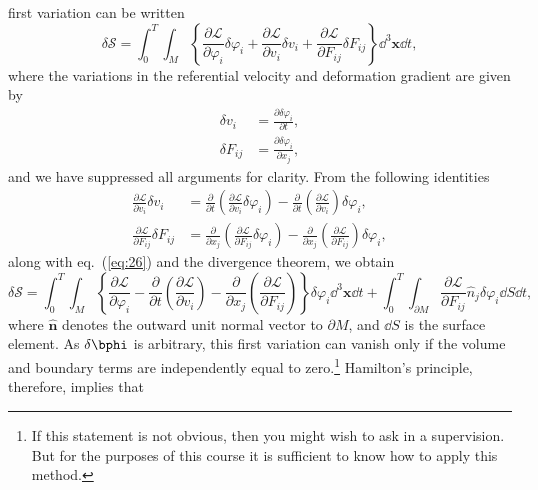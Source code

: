 first variation can be written
\begin{equation}
\delta\mathcal{S}=\int_{0}^{T}\int_{M}\left\{\frac{\partial\mathcal{L}}{\partial\varphi_{i}}\delta\varphi_{i}+
\frac{\partial\mathcal{L}}{\partial v_{i}}\delta v_{i}+\frac{\partial\mathcal{L}}{\partial F_{ij}}\delta F_{ij}\right\}\dd^{3}\mathbf{x}\dd t,
\label{eq:28}
\end{equation}
where the variations in the referential velocity and deformation gradient are given by
\begin{align}
\delta v_{i}&=\frac{\partial\delta\varphi_{i}}{\partial t}, \label{eq:29a}\\
\delta F_{ij}&=\frac{\partial\delta\varphi_{i}}{\partial x_{j}}, \label{eq:29b}
\end{align}
and we have suppressed all arguments for clarity. From the following identities
\begin{align}
\frac{\partial\mathcal{L}}{\partial v_{i}}\delta v_{i}&=\frac{\partial}{\partial t}\left(\frac{\partial\mathcal{L}}{\partial v_{i}}\delta\varphi_{i}
\right)-\frac{\partial}{\partial t}\left(\frac{\partial\mathcal{L}}{\partial v_{i}}\right)\delta\varphi_{i}, \label{eq:30}\\
\frac{\partial\mathcal{L}}{\partial F_{ij}}\delta F_{ij}&=\frac{\partial}{\partial x_{j}}\left(\frac{\partial\mathcal{L}}
{\partial F_{ij}}\delta\varphi_{i}\right)-\frac{\partial}{\partial x_{j}}\left(\frac{\partial\mathcal{L}}{\partial F_{ij}}\right)\delta\varphi_{i}, \label{eq:31}
\end{align}
along with eq.~(\ref{eq:26}) and the divergence theorem, we obtain
\begin{equation}
\delta\mathcal{S}=\int_{0}^{T}\int_{M}\left\{\frac{\partial\mathcal{L}}{\partial\varphi_{i}}-
\frac{\partial}{\partial t}\left(\frac{\partial\mathcal{L}}{\partial v_{i}}\right)-\frac{\partial}{\partial x_{j}}
\left(\frac{\partial\mathcal{L}}{\partial F_{ij}}\right)\right\}\delta\varphi_{i}\dd^{3}\mathbf{x}\dd t+
\int_{0}^{T}\int_{\partial M}\frac{\partial\mathcal{L}}{\partial F_{ij}}\hat{n}_{j}\delta\varphi_{i}\dd S\dd t,
\label{eq:32}
\end{equation}
where $\hat{\mathbf{n}}$ denotes the outward unit normal vector to $\partial M$, and $\dd S$ is the surface element. 
As $\delta\bphi$ is arbitrary, this first variation can vanish only if the volume and boundary terms are 
independently equal to zero.\footnote{If this statement is not obvious, then you might wish to ask in a supervision. But for the 
purposes of this course it is sufficient to know how to apply this method.} Hamilton's principle, therefore, implies that 
